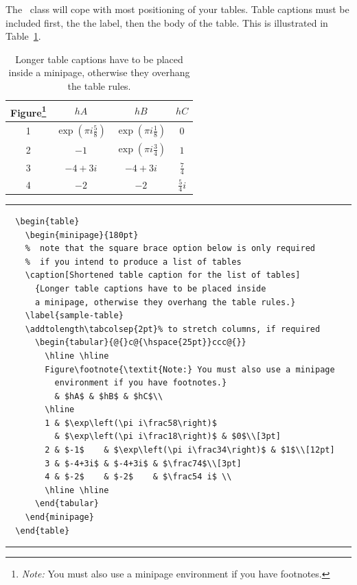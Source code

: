 The \cambridge\ class will cope with most positioning of your tables. Table captions must be included first, the the label, then the body of the table. This is illustrated in Table~\ref{sample-table}.
  \begin{table}[h!]
    \begin{minipage}{180pt}
    \caption[Shortened table caption for the list of tables]
      {Longer table captions have to be placed inside
      a minipage, otherwise they overhang the table rules.}
    \label{sample-table}
    \addtolength\tabcolsep{2pt}%
      \begin{tabular}{@{}c@{\hspace{25pt}}ccc@{}}
        \hline \hline
        Figure\footnote{\textit{Note:} You must also use a minipage
          environment if you have footnotes.}
          & $hA$ & $hB$ & $hC$\\
        \hline
        1 & $\exp\left(\pi i\frac58\right)$
          & $\exp\left(\pi i\frac18\right)$ & $0$\\[3pt]
        2 & $-1$    & $\exp\left(\pi i\frac34\right)$ & $1$\\[12pt]
        3 & $-4+3i$ & $-4+3i$ & $\frac74$\\[3pt]
        4 & $-2$    & $-2$    & $\frac54 i$ \\
        \hline \hline
      \end{tabular}
    \end{minipage}
    \rule[-20pt]{\textwidth}{0.5pt}
\begin{verbatim}
  \begin{table}
    \begin{minipage}{180pt}
    %  note that the square brace option below is only required
    %  if you intend to produce a list of tables
    \caption[Shortened table caption for the list of tables]
      {Longer table captions have to be placed inside
      a minipage, otherwise they overhang the table rules.}
    \label{sample-table}
    \addtolength\tabcolsep{2pt}% to stretch columns, if required
      \begin{tabular}{@{}c@{\hspace{25pt}}ccc@{}}
        \hline \hline
        Figure\footnote{\textit{Note:} You must also use a minipage
          environment if you have footnotes.}
          & $hA$ & $hB$ & $hC$\\
        \hline
        1 & $\exp\left(\pi i\frac58\right)$
          & $\exp\left(\pi i\frac18\right)$ & $0$\\[3pt]
        2 & $-1$    & $\exp\left(\pi i\frac34\right)$ & $1$\\[12pt]
        3 & $-4+3i$ & $-4+3i$ & $\frac74$\\[3pt]
        4 & $-2$    & $-2$    & $\frac54 i$ \\
        \hline \hline
      \end{tabular}
    \end{minipage}
  \end{table}
\end{verbatim}
\rule[20pt]{\textwidth}{0.5pt}
  \end{table}


